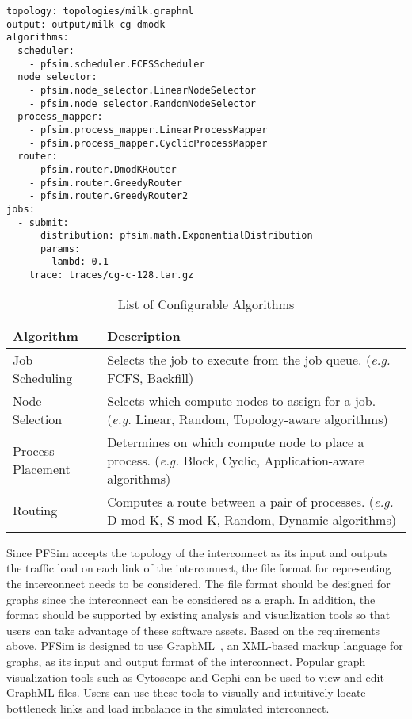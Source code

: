 \begin{lstlisting}[caption={Example of a Simulation Scenario},%
                   label={lst:simulation-scenario}, linewidth={\columnwidth},%
                   float={htbp}]
topology: topologies/milk.graphml
output: output/milk-cg-dmodk
algorithms:
  scheduler:
    - pfsim.scheduler.FCFSScheduler
  node_selector:
    - pfsim.node_selector.LinearNodeSelector
    - pfsim.node_selector.RandomNodeSelector
  process_mapper:
    - pfsim.process_mapper.LinearProcessMapper
    - pfsim.process_mapper.CyclicProcessMapper
  router:
    - pfsim.router.DmodKRouter
    - pfsim.router.GreedyRouter
    - pfsim.router.GreedyRouter2
jobs:
  - submit:
      distribution: pfsim.math.ExponentialDistribution
      params:
        lambd: 0.1
    trace: traces/cg-c-128.tar.gz
\end{lstlisting}

\begin{table}
    \centering
    \normalsize
    \caption{List of Configurable Algorithms}%
    \label{tbl:simulator-algorithm}
    \begin{tabularx}{\linewidth}{lX}
        \toprule
        Algorithm         & Description                                                 \\
        \midrule
        Job Scheduling    & Selects the job to execute from the job queue.
                            (\emph{e.g.} FCFS, Backfill)                                \\
        Node Selection    & Selects which compute nodes to assign for a job.
                            (\emph{e.g.} Linear, Random, Topology-aware algorithms)     \\
        Process Placement & Determines on which compute node to place a process.
                            (\emph{e.g.} Block, Cyclic, Application-aware algorithms)   \\
        Routing           & Computes a route between a pair of processes.
                            (\emph{e.g.} D-mod-K, S-mod-K, Random, Dynamic algorithms)  \\
        \bottomrule
    \end{tabularx}
\end{table}

Since PFSim accepts the topology of the interconnect as its input and outputs
the traffic load on each link of the interconnect, the file format for
representing the interconnect needs to be considered. The file format should
be designed for graphs since the interconnect can be considered as a graph. In
addition, the format should be supported by existing analysis and
visualization tools so that users can take advantage of these software assets.
Based on the requirements above, PFSim is designed to use
GraphML~\autocite{Brandes2013}, an XML-based markup language for graphs, as
its input and output format of the interconnect. Popular graph visualization
tools such as Cytoscape and Gephi can be used to view and edit GraphML files.
Users can use these tools to visually and intuitively locate bottleneck links
and load imbalance in the simulated interconnect.

